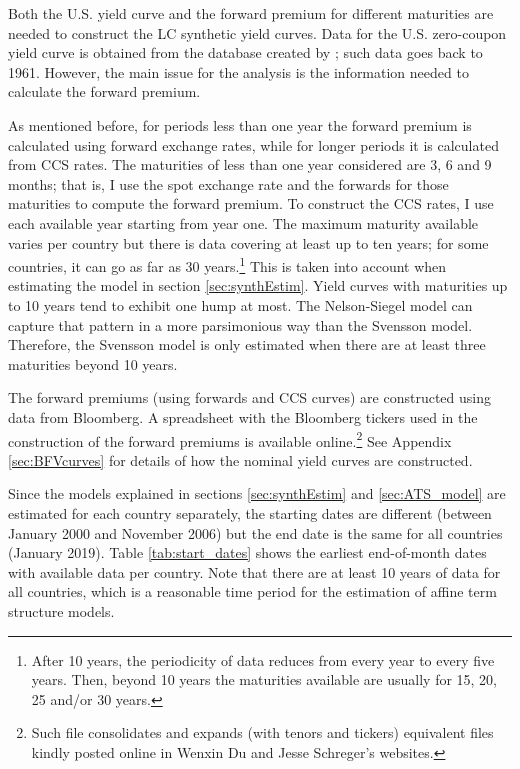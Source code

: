 Both the U.S. yield curve and the forward premium for different maturities are needed to construct the LC synthetic yield curves. Data for the U.S. zero-coupon yield curve is obtained from the database created by \cite{GSW:2007}; such data goes back to 1961. However, the main issue for the analysis is the information needed to calculate the forward premium. 

As mentioned before, for periods less than one year the forward premium is calculated using forward exchange rates, while for longer periods it is calculated from CCS rates. The maturities of less than one year considered are 3, 6 and 9 months; that is, I use the spot exchange rate and the forwards for those maturities to compute the forward premium. To construct the CCS rates, I use each available year starting from year one. The maximum maturity available varies per country but there is data covering at least up to ten years; for some countries, it can go as far as 30 years.\footnote{After 10 years, the periodicity of data reduces from every year to every five years. Then, beyond 10 years the maturities available are usually for 15, 20, 25 and/or 30 years.} This is taken into account when estimating the model in section \ref{sec:synthEstim}. Yield curves with maturities up to 10 years tend to exhibit one hump at most. The Nelson-Siegel model can capture that pattern in a more parsimonious way than the Svensson model. Therefore, the Svensson model is only estimated when there are at least three maturities beyond 10 years.

The forward premiums (using forwards and CCS curves) are constructed using data from Bloomberg. A spreadsheet with the Bloomberg tickers used in the construction of the forward premiums is available online.\footnote{Such file consolidates and expands (with tenors and tickers) equivalent files kindly posted online in Wenxin Du and Jesse Schreger's websites.} See Appendix \ref{sec:BFVcurves} for details of how the nominal yield curves are constructed.

Since the models explained in sections \ref{sec:synthEstim} and \ref{sec:ATS_model} are estimated for each country separately, the starting dates are different (between January 2000 and November 2006) but the end date is the same for all countries (January 2019). Table \ref{tab:start_dates} shows the earliest end-of-month dates with available data per country. Note that there are at least 10 years of data for all countries, which is a reasonable time period for the estimation of affine term structure models.
	
 
